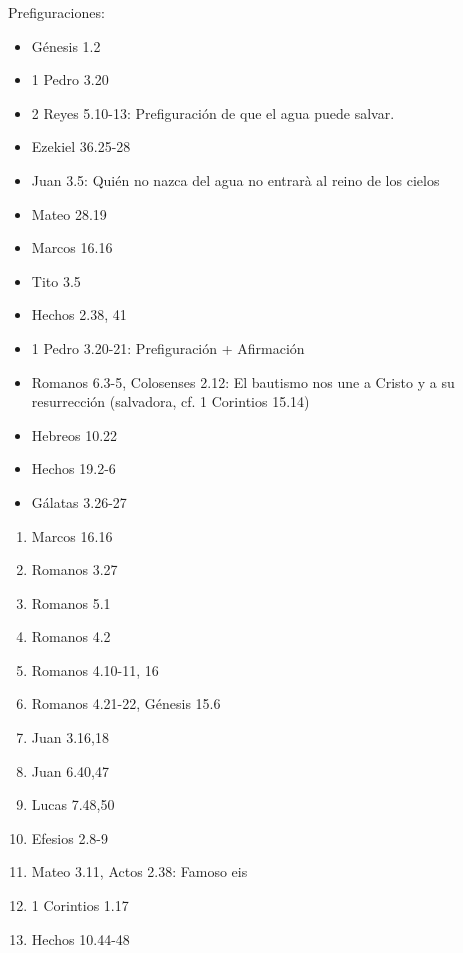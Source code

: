 \documentclass[12pt]{report}
\begin{document}
	\begin{subbloque} Prefiguraciones:
		\begin{itemize}
			\item Génesis 1.2
			\item 1 Pedro 3.20
			\item 2 Reyes 5.10-13: Prefiguración de que el agua puede salvar.
			\item Ezekiel 36.25-28
		\end{itemize}
		\begin{itemize}
			\item Juan 3.5: Quién no nazca del agua no entrarà al reino de los cielos
			\item Mateo 28.19
			\item Marcos 16.16
			\item Tito 3.5
			\item Hechos 2.38, 41
			\item 1 Pedro 3.20-21: Prefiguración + Afirmación
			\item Romanos 6.3-5, Colosenses 2.12: El bautismo nos une a Cristo y a su resurrección (salvadora, cf. 1 Corintios 15.14)
			\item Hebreos 10.22
			\item Hechos 19.2-6
			\item Gálatas 3.26-27
		\end{itemize}
	\end{subbloque}
	
	\begin{subminibloque}
		\begin{enumerate}
			\item Marcos 16.16
			\item Romanos 3.27
			\item Romanos 5.1
			\item Romanos 4.2
			\item Romanos 4.10-11, 16
			\item Romanos 4.21-22, Génesis 15.6
			\item Juan 3.16,18
			\item Juan 6.40,47
			\item Lucas 7.48,50
			\item Efesios 2.8-9
			\item Mateo 3.11, Actos 2.38: Famoso eis
			\item 1 Corintios 1.17
			\item Hechos 10.44-48
		\end{enumerate}
	\end{subminibloque}
	
\end{document}
